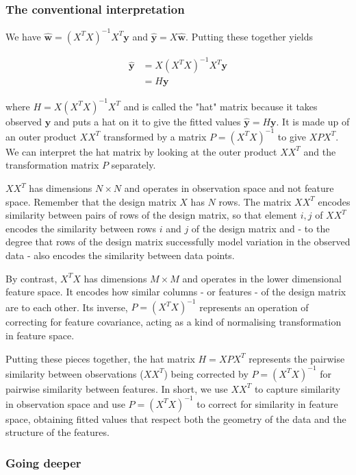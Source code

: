 \documentclass[11pt]{article}
\begin{document}
	\subsubsection{The conventional interpretation}
	
	We have $\boldsymbol{\hat{w}} = (X^{T}X)^{-1}X^{T}\boldsymbol{y}$ and $\boldsymbol{\hat{y}} = X\boldsymbol{\hat{w}}$. Putting these together yields
	
	\begin{align*}
		\boldsymbol{\hat{y}} &= X(X^{T}X)^{-1}X^{T}\boldsymbol{y} \\
		&= H\boldsymbol{y}
	\end{align*}
	
	where $H = X(X^{T}X)^{-1}X^{T}$ and is called the "hat" matrix because it takes observed $\boldsymbol{y}$ and puts a hat on it to give the fitted values $\boldsymbol{\hat{y}} = H\boldsymbol{y}$. It is made up of an outer product $XX^{T}$ transformed by a matrix $P = (X^{T}X)^{-1}$ to give $XPX^{T}$. We can interpret the hat matrix by looking at the outer product $XX^{T}$ and the transformation matrix $P$ separately.
	
	$XX^{T}$ has dimensions $N \times N$ and operates in observation space and not feature space. Remember that the design matrix $X$ has $N$ rows. The matrix $XX^{T}$ encodes similarity between pairs of rows of the design matrix, so that element ${i, j}$ of $XX^{T}$ encodes the similarity between rows $i$ and $j$ of the design matrix and - to the degree that rows of the design matrix successfully model variation in the observed data - also encodes the similarity between data points.
	
	By contrast, $X^{T}X$ has dimensions $M \times M$ and operates in the lower dimensional feature space. It encodes how similar columns - or features - of the design matrix are to each other. Its inverse, $P = (X^{T}X)^{-1}$ represents an operation of correcting for feature covariance, acting as a kind of normalising transformation in feature space.
	
	Putting these pieces together, the hat matrix $H = XPX^{T}$ represents the pairwise similarity between observations ($XX^{T}$) being corrected by $P = (X^{T}X)^{-1}$ for pairwise similarity between features. In short, we use $XX^{T}$ to capture similarity in observation space and use $P = (X^{T}X)^{-1}$ to correct for similarity in feature space, obtaining fitted values that respect both the geometry of the data and the structure of the features.
	
	\subsubsection{Going deeper}
	
\end{document}
